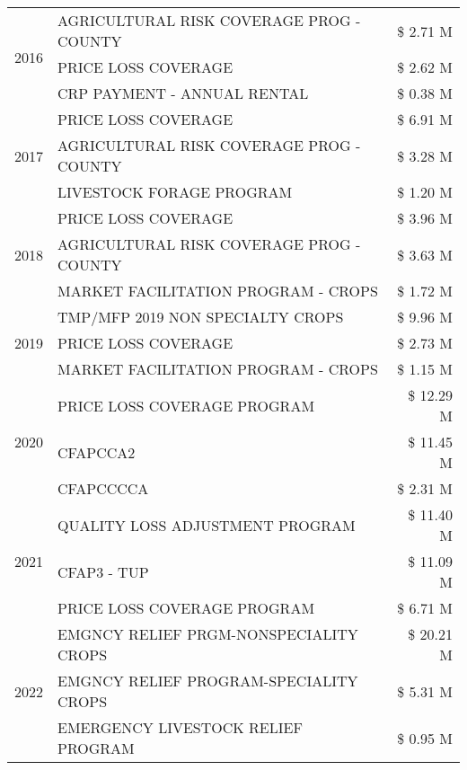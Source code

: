 \begin{tabular}{llr}
\cline{1-3}
\multirow[t]{3}{*}{2016} & AGRICULTURAL RISK COVERAGE PROG - COUNTY & \$ 2.71 M \\
 & PRICE LOSS COVERAGE & \$ 2.62 M \\
 & CRP PAYMENT - ANNUAL RENTAL & \$ 0.38 M \\
\cline{1-3}
\multirow[t]{3}{*}{2017} & PRICE LOSS COVERAGE & \$ 6.91 M \\
 & AGRICULTURAL RISK COVERAGE PROG - COUNTY & \$ 3.28 M \\
 & LIVESTOCK FORAGE PROGRAM & \$ 1.20 M \\
\cline{1-3}
\multirow[t]{3}{*}{2018} & PRICE LOSS COVERAGE & \$ 3.96 M \\
 & AGRICULTURAL RISK COVERAGE PROG - COUNTY & \$ 3.63 M \\
 & MARKET FACILITATION PROGRAM - CROPS & \$ 1.72 M \\
\cline{1-3}
\multirow[t]{3}{*}{2019} & TMP/MFP 2019 NON SPECIALTY CROPS & \$ 9.96 M \\
 & PRICE LOSS COVERAGE & \$ 2.73 M \\
 & MARKET FACILITATION PROGRAM - CROPS & \$ 1.15 M \\
\cline{1-3}
\multirow[t]{3}{*}{2020} & PRICE LOSS COVERAGE PROGRAM & \$ 12.29 M \\
 & CFAPCCA2 & \$ 11.45 M \\
 & CFAPCCCCA & \$ 2.31 M \\
\cline{1-3}
\multirow[t]{3}{*}{2021} & QUALITY LOSS ADJUSTMENT PROGRAM & \$ 11.40 M \\
 & CFAP3 - TUP & \$ 11.09 M \\
 & PRICE LOSS COVERAGE PROGRAM & \$ 6.71 M \\
\cline{1-3}
\multirow[t]{3}{*}{2022} & EMGNCY RELIEF PRGM-NONSPECIALITY CROPS & \$ 20.21 M \\
 & EMGNCY RELIEF PROGRAM-SPECIALITY CROPS & \$ 5.31 M \\
 & EMERGENCY LIVESTOCK RELIEF PROGRAM & \$ 0.95 M \\
\cline{1-3}
\bottomrule
\end{tabular}
